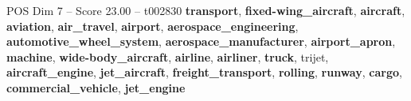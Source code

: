 \begin{textsample}{POS Dim 7 – Score 23.00 – t002830}  \label{ex:f7_pos_011}
\textbf{transport}, \textbf{fixed-wing\_aircraft}, \textbf{aircraft}, \textbf{aviation}, \textbf{air\_travel}, \textbf{airport}, \textbf{aerospace\_engineering}, \textbf{automotive\_wheel\_system}, \textbf{aerospace\_manufacturer}, \textbf{airport\_apron}, \textbf{machine}, \textbf{wide-body\_aircraft}, \textbf{airline}, \textbf{airliner}, \textbf{truck}, trijet, \textbf{aircraft\_engine}, \textbf{jet\_aircraft}, \textbf{freight\_transport}, \textbf{rolling}, \textbf{runway}, \textbf{cargo}, \textbf{commercial\_vehicle}, \textbf{jet\_engine}

\end{textsample}
